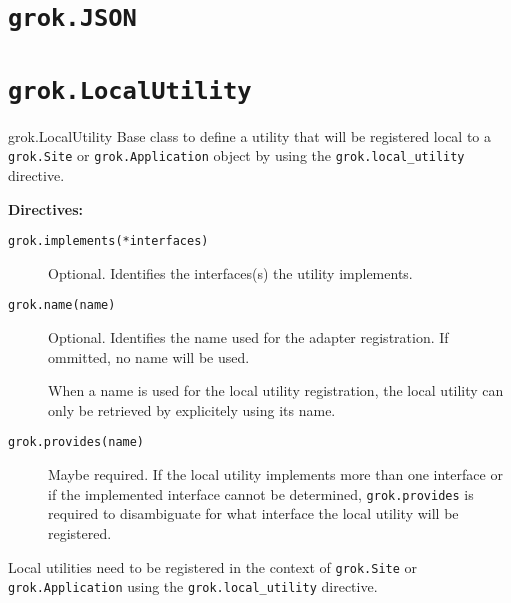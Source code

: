 \documentclass[10pt,a4paper,english]{manual}
\begin{document}

\section{\texttt{grok.JSON}}



\section{\texttt{grok.LocalUtility}}
\begin{classdesc*}{grok.LocalUtility}
Base class to define a utility that will be registered local to a
\texttt{grok.Site} or \texttt{grok.Application} object by using the
\texttt{grok.local{\_}utility} directive.

\textbf{Directives:}
\begin{description}
\item[{\texttt{grok.implements(*interfaces)}}] %

Optional. Identifies the interfaces(s) the utility implements.

\item[{\texttt{grok.name(name)}}] %

Optional. Identifies the name used for the adapter registration. If ommitted, no
name will be used.

When a name is used for the local utility registration, the local utility can
only be retrieved by explicitely using its name.

\item[{\texttt{grok.provides(name)}}] %

Maybe required. If the local utility implements more than one interface or if
the implemented interface cannot be determined, \texttt{grok.provides} is
required to disambiguate for what interface the local utility will be
registered.

\end{description}
\end{classdesc*}
\begin{seealso}

Local utilities need to be registered in the context of \texttt{grok.Site} or
\texttt{grok.Application} using the \texttt{grok.local{\_}utility} directive.
\end{seealso}
\end{document}
